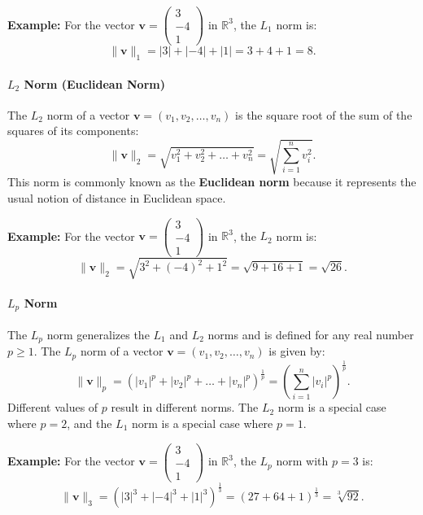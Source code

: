 \documentclass[]{article}
\begin{document}
	\noindent
	\textbf{Example:}
	For the vector $\mathbf{v} = \begin{pmatrix} 3 \\ -4 \\ 1 \end{pmatrix}$ in $\mathbb{R}^3$, the $L_1$ norm is:
	$$
	\|\mathbf{v}\|_1 = |3| + |-4| + |1| = 3 + 4 + 1 = 8.
	$$
	
	\paragraph{$L_2$ Norm (Euclidean Norm)}
	The $L_2$ norm of a vector $\mathbf{v} = (v_1, v_2, \dots, v_n)$ is the square root of the sum of the squares of its components:
	$$
	\|\mathbf{v}\|_2 = \sqrt{v_1^2 + v_2^2 + \dots + v_n^2} = \sqrt{\sum_{i=1}^{n} v_i^2}.
	$$
	This norm is commonly known as the \textbf{Euclidean norm} because it represents the usual notion of distance in Euclidean space.
	
	\noindent
	\textbf{Example:}
	For the vector $\mathbf{v} = \begin{pmatrix} 3 \\ -4 \\ 1 \end{pmatrix}$ in $\mathbb{R}^3$, the $L_2$ norm is:
	$$
	\|\mathbf{v}\|_2 = \sqrt{3^2 + (-4)^2 + 1^2} = \sqrt{9 + 16 + 1} = \sqrt{26}.
	$$
	
	\paragraph{$L_p$ Norm}
	The $L_p$ norm generalizes the $L_1$ and $L_2$ norms and is defined for any real number $p \geq 1$.
	The $L_p$ norm of a vector $\mathbf{v} = (v_1, v_2, \dots, v_n)$ is given by:
	$$
	\|\mathbf{v}\|_p = \left( |v_1|^p + |v_2|^p + \dots + |v_n|^p \right)^{\frac{1}{p}} = \left(\sum_{i=1}^{n} |v_i|^p\right)^{\frac{1}{p}}.
	$$
	Different values of $p$ result in different norms.
	The $L_2$ norm is a special case where $p = 2$, and the $L_1$ norm is a special case where $p = 1$.
	
	\noindent
	\textbf{Example:}
	For the vector $\mathbf{v} = \begin{pmatrix} 3 \\ -4 \\ 1 \end{pmatrix}$ in $\mathbb{R}^3$, the $L_p$ norm with $p = 3$ is:
	$$
	\|\mathbf{v}\|_3 = \left( |3|^3 + |-4|^3 + |1|^3 \right)^{\frac{1}{3}} = \left( 27 + 64 + 1 \right)^{\frac{1}{3}} = \sqrt[3]{92}.
	$$
	
\end{document}
